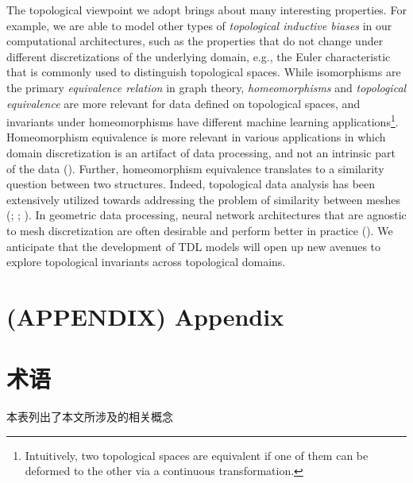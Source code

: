 \documentclass[
  12pt,
]{krantz}
\begin{document}
The topological viewpoint we adopt brings about many interesting
properties. For example, we are able to model other types of
\emph{topological inductive biases} in our computational architectures,
such as the properties that do not change under different
discretizations of the underlying domain, e.g., the Euler characteristic
that is commonly used to distinguish topological spaces. While
isomorphisms are the primary \emph{equivalence relation} in graph
theory, \emph{homeomorphisms} and \emph{topological equivalence} are
more relevant for data defined on topological spaces, and invariants
under homeomorphisms have different machine learning
applications\footnote{Intuitively, two topological spaces are equivalent
  if one of them can be deformed to the other via a continuous
  transformation.}. Homeomorphism equivalence is more relevant in
various applications in which domain discretization is an artifact of
data processing, and not an intrinsic part of the data
(). Further,
homeomorphism equivalence translates to a similarity question between
two structures. Indeed, topological data analysis has been extensively
utilized towards addressing the problem of similarity between meshes
(;
;
). In
geometric data processing, neural network architectures that are
agnostic to mesh discretization are often desirable and perform better
in practice ().
We anticipate that the development of TDL models will open up new
avenues to explore topological invariants across topological domains.

\cleardoublepage

\section*{(APPENDIX) Appendix}\label{appendix-appendix}

\section{术语}\label{glossary}

本表列出了本文所涉及的相关概念
\end{document}
